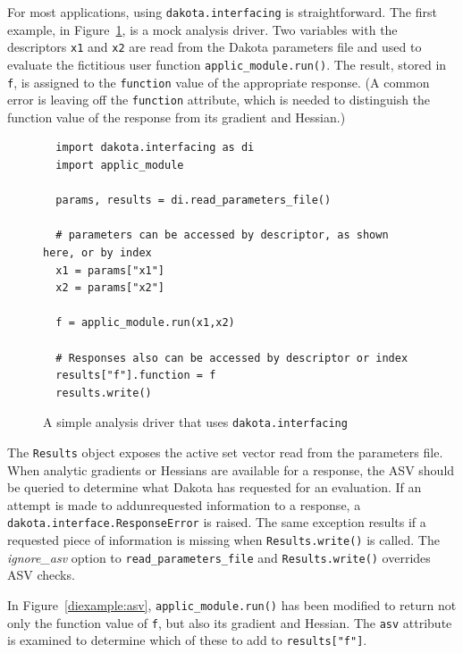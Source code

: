 For most applications, using {\tt dakota.interfacing} is straightforward. The first example, in Figure~\ref{diexample:simple}, is a mock analysis driver. Two variables with the descriptors {\tt x1} and {\tt x2} are read from the Dakota parameters file and used to evaluate the fictitious user function {\tt applic\_module.run()}. The result, stored in {\tt f}, is assigned to the {\tt function} value of the appropriate response. (A common error is leaving off the {\tt function} attribute, which is needed to distinguish the function value of the response from its gradient and Hessian.)

\begin{figure}
\begin{bigbox}
\begin{small}
\begin{verbatim}
  import dakota.interfacing as di
  import applic_module 

  params, results = di.read_parameters_file()

  # parameters can be accessed by descriptor, as shown here, or by index
  x1 = params["x1"]
  x2 = params["x2"]

  f = applic_module.run(x1,x2)

  # Responses also can be accessed by descriptor or index
  results["f"].function = f
  results.write()
\end{verbatim}
\end{small}
\end{bigbox}
\caption{A simple analysis driver that uses {\tt dakota.interfacing}}
\label{diexample:simple}
\end{figure}

The {\tt Results} object exposes the active set vector read from the parameters file. When analytic gradients or Hessians are available for a response, the ASV should be queried to determine what Dakota has requested for an evaluation. If an attempt is made to addunrequested information to a response, a {\tt dakota.interface.ResponseError} is raised. The same exception results if a requested piece of information is missing when {\tt Results.write()} is called. The \emph{ignore\_asv} option to {\tt read\_parameters\_file} and {\tt Results.write()} overrides ASV checks.

In Figure~\ref{diexample:asv}, {\tt applic\_module.run()} has been modified to return not only the function value of {\tt f}, but also its gradient and Hessian. The {\tt asv} attribute is examined to determine which of these to add to {\tt results["f"]}.

